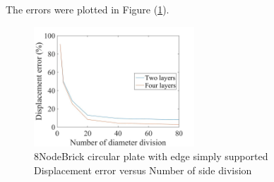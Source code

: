 \documentclass[fleqn,11pt]{article}
\begin{document}

The errors were plotted in Figure (\ref{fig 8NodeBrick circular plate with four edge simply supported}).

\begin{figure}[H]
    \centering
    \includegraphics[width=6cm]{../Figure-files/error8brick_circular_plate_simply_supported.jpeg}
  \captionsetup{justification=centering,margin=3cm}
  \caption{8NodeBrick circular plate with edge simply supported\\
      Displacement error   versus   Number of side division}
  \label{fig 8NodeBrick circular plate with four edge simply supported}
\end{figure}
\end{document}
